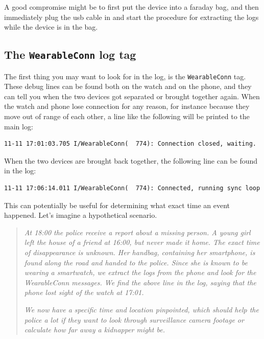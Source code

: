 \documentclass[a4paper,11pt,dvips]{article}
\begin{document}
A good compromise might be to first put the device into a faraday bag, and then immediately plug the usb cable in and start the procedure for extracting the logs while the device is in the bag.


\subsection{The \texttt{WearableConn} log tag}

The first thing you may want to look for in the log, is the \texttt{WearableConn} tag. These debug lines can be found both on the watch and on the phone, and they can tell you when the two devices got separated or brought together again. When the watch and phone lose connection for any reason, for instance because they move out of range of each other, a line like the following will be printed to the main log:

\scriptsize
\begin{verbatim}
11-11 17:01:03.705 I/WearableConn(  774): Connection closed, waiting.
\end{verbatim}
\normalsize

\noindent
When the two devices are brought back together, the following line can be found in the log:

\scriptsize
\begin{verbatim}
11-11 17:06:14.011 I/WearableConn(  774): Connected, running sync loop
\end{verbatim}
\normalsize

\noindent
This can potentially be useful for determining what exact time an event happened. Let's imagine a hypothetical scenario.

\begin{quote}
\textit{At 18:00 the police receive a report about a missing person. A young girl left the house of a friend at 16:00, but never made it home. The exact time of disappearance is unknown. Her handbag, containing her smartphone, is found along the road and handed to the police. Since she is known to be wearing a smartwatch, we extract the logs from the phone and look for the WearableConn messages. We find the above line in the log, saying that the phone lost sight of the watch at 17:01.}

\textit{We now have a specific time and location pinpointed, which should help the police a lot if they want to look through surveillance camera footage or calculate how far away a kidnapper might be.}
\end{quote}
\end{document}
